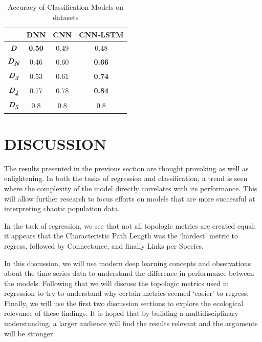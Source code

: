 \documentclass[letterpaper, 10 pt, conference]{ieeeconf}  %
\begin{document}
\begin{table}
\caption{Accuracy of Classification Models on datasets}
\setlength{\tabcolsep}{5mm} %
\def\arraystretch{1.25} %
\centering

  \begin{tabular}{|c|c|c|c|}
	\hline
    & \textbf{DNN} & \textbf{CNN} & \textbf{CNN-LSTM} \\ \hline
    \textbf{\textit{D}} & \textbf{0.50} & 0.49 & 0.48 \\ \hline
    \textbf{\textit{D\textsubscript{N}}} & 0.46 & 0.60 & \textbf{0.66} \\ \hline
    \textbf{\textit{D\textsubscript{3}}} & 0.53 & 0.61 & \textbf{0.74} \\ \hline
    \textbf{\textit{D\textsubscript{4}}} & 0.77 & 0.78 & \textbf{0.84}\\ \hline
    \textbf{\textit{D\textsubscript{5}}} & 0.8 & 0.8 & 0.8 \\ \hline
  \end{tabular}
\end{table}

\section{DISCUSSION}
	
    The results presented in the previous section are thought provoking as well as enlightening. In both the tasks of regression and classification, a trend is seen where the complexity of the model directly correlates with its performance. This will allow further research to focus efforts on models that are more successful at interpreting chaotic population data. 

    In the task of regression, we see that not all topologic metrics are created equal: it appears that the Characteristic Path Length was the ‘hardest’ metric to regress, followed by Connectance, and finally Links per Species.
    
    In this discussion, we will use modern deep learning concepts and observations about the time series data to understand the difference in performance between the models. Following that we will discuss the topologic metrics used in regression to try to understand why certain metrics seemed ‘easier’ to regress. Finally, we will use the first two discussion sections to explore the ecological relevance of these findings. It is hoped that by building a multidisciplinary understanding, a larger audience will find the results relevant and the arguments will be stronger. 
\end{document}
